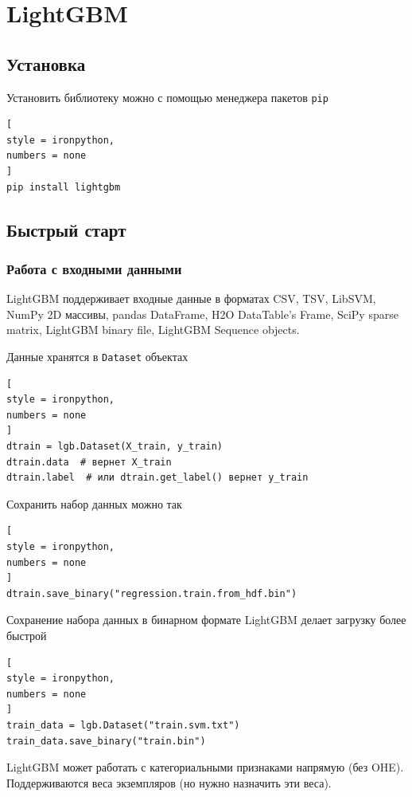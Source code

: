 \documentclass[%
	11pt,
	a4paper,
	utf8,
		]{article}
\begin{document}
\section{LightGBM}

\subsection{Установка}

Установить библиотеку можно с помощью менеджера пакетов \verb|pip|
\begin{lstlisting}[
style = ironpython,
numbers = none
]
pip install lightgbm
\end{lstlisting}

\subsection{Быстрый старт}

\subsubsection{Работа с входными данными}

LightGBM поддерживает входные данные в форматах CSV, TSV, LibSVM, NumPy 2D массивы, pandas DataFrame, H2O DataTable's Frame, SciPy sparse matrix, LightGBM binary file, LightGBM Sequence objects.

Данные хранятся в \verb|Dataset| объектах
\begin{lstlisting}[
style = ironpython,
numbers = none
]
dtrain = lgb.Dataset(X_train, y_train)
dtrain.data  # вернет X_train
dtrain.label  # или dtrain.get_label() вернет y_train
\end{lstlisting}

Сохранить набор данных можно так
\begin{lstlisting}[
style = ironpython,
numbers = none
]
dtrain.save_binary("regression.train.from_hdf.bin")
\end{lstlisting}

Сохранение набора данных в бинарном формате LightGBM делает загрузку более быстрой
\begin{lstlisting}[
style = ironpython,
numbers = none
]
train_data = lgb.Dataset("train.svm.txt")
train_data.save_binary("train.bin")
\end{lstlisting}

LightGBM может работать с категориальными признаками напрямую (без OHE). Поддерживаются веса экземпляров (но нужно назначить эти веса). 
\end{document}
